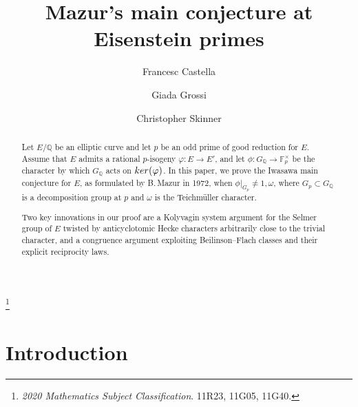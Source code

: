 \documentclass[a4paper,10pt]{amsart}
\numberwithin{equation}{section}
\numberwithin{equation}{section}
\newcommand\blfootnote[1]{%
  \begingroup
  \renewcommand\thefootnote{}\footnote{#1}%
  \addtocounter{footnote}{-1}%
  \endgroup
}
\theoremstyle{plain}
\theoremstyle{definition}
\theoremstyle{definition}
\theoremstyle{plain}
\theoremstyle{plain}
\theoremstyle{plain}
\theoremstyle{plain}
\newcommand{\bQ}{\mathbb{Q}}
\newcommand{\Q}{\mathbb{Q}}
\begin{document}
\title{Mazur's main conjecture %
at Eisenstein primes}\blfootnote{\emph{2020 Mathematics Subject Classification}. 11R23, 11G05, 11G40.}
\author{Francesc Castella}
\address[F.~Castella]{University of California Santa Barbara, South Hall, Santa Barbara, CA 93106, USA}

\author{Giada Grossi}
\address[G.~Grossi]{CNRS, Institut Galilée, Université Sorbonne Paris Nord, 93430 Villetaneuse, FRANCE}

 
\author{Christopher Skinner} 
\address[C.~Skinner]{Princeton University, Fine Hall, Washington Road, Princeton, NJ 08544-1000, USA}


\begin{abstract}
Let $E/\Q$ be an elliptic curve and let $p$ be an odd prime of good reduction for $E$. Assume that $E$ admits a rational $p$-isogeny $\varphi:E\rightarrow E'$, and let $\phi:G_{\bQ}\rightarrow\mathbb{F}_p^\times$ be the character by which $G_{\bQ}$ acts on ${\rm ker}(\varphi)$. In this paper, we prove the Iwasawa main conjecture for $E$, as formulated by B.\,Mazur in 1972, when $\phi\vert_{G_p}\neq 1,\omega$, where $G_p\subset G_{\bQ}$ is a decomposition group at $p$ and $\omega$ is the Teichm\"uller character. 

Two key innovations in our proof are a Kolyvagin system argument for the Selmer group of $E$ twisted by anticyclotomic Hecke characters arbitrarily close to the trivial character, and a congruence argument exploiting Beilinson--Flach classes and their explicit reciprocity laws. 
%
\end{abstract}


\maketitle
\tableofcontents


\section{Introduction}
\end{document}
